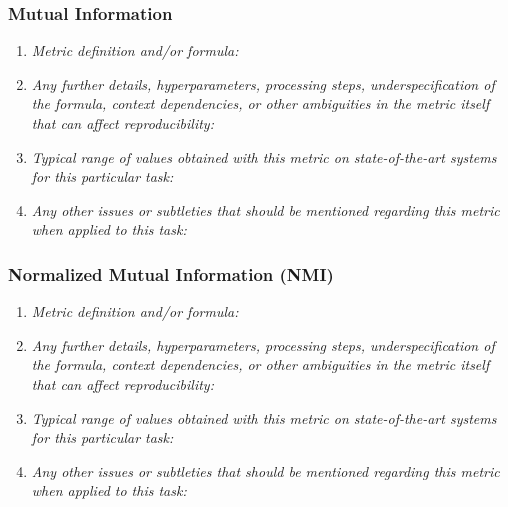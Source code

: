 \documentclass[a4paper,11pt]{article}
\begin{document}
        \subsubsection{Mutual Information}
            \begin{enumerate}[label=\alph*.]
                \item \textit{Metric definition and/or formula:}
                \bigskip
                \item \textit{Any further details, hyperparameters, processing steps, underspecification of the formula, context dependencies, or other ambiguities in the metric itself that can affect reproducibility:}
                \bigskip
                \item \textit{Typical range of values obtained with this metric on state-of-the-art systems for this particular task:}
                \bigskip
                \item \textit{Any other issues or subtleties that should be mentioned regarding this metric when applied to this task:}
                \bigskip
            \end{enumerate}
        \subsubsection{Normalized Mutual Information (NMI)}
            \begin{enumerate}[label=\alph*.]
                \item \textit{Metric definition and/or formula:}
                \bigskip
                \item \textit{Any further details, hyperparameters, processing steps, underspecification of the formula, context dependencies, or other ambiguities in the metric itself that can affect reproducibility:}
                \bigskip
                \item \textit{Typical range of values obtained with this metric on state-of-the-art systems for this particular task:}
                \bigskip
                \item \textit{Any other issues or subtleties that should be mentioned regarding this metric when applied to this task:}
                \bigskip
            \end{enumerate}
\end{document}
